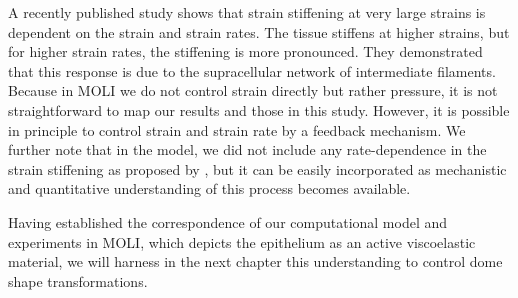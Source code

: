 A recently published study \cite{duque2023} shows that strain stiffening at very large strains is dependent on the strain and strain rates. The tissue stiffens at higher strains, but for higher strain rates, the stiffening is more pronounced. %
They demonstrated that this response is due to the supracellular network of intermediate filaments. Because in MOLI we do not control strain directly but rather pressure, it is not straightforward to map our results and those in this study. However, it is possible in principle to control strain and strain rate by a feedback mechanism. %
We further note that in the model, we did not include any rate-dependence in the strain stiffening as proposed by \citet{duque2023}, but it can be easily incorporated as mechanistic and quantitative understanding of this process becomes available.


Having established the correspondence of our computational model and experiments in MOLI, which depicts  the epithelium as an active viscoelastic material, we will harness in the next chapter this understanding to control dome shape transformations.
